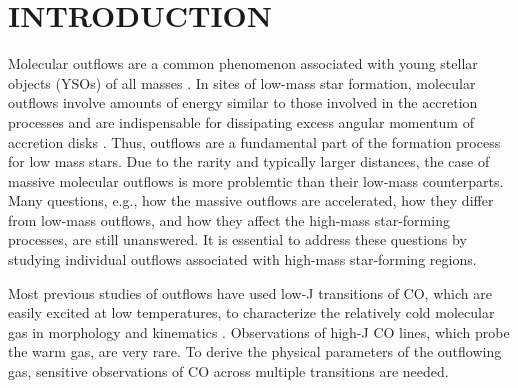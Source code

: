 \section{INTRODUCTION}
Molecular outflows are a common phenomenon associated with young stellar objects (YSOs) of all masses \citep{ 1985ARA&A..23..267L,1993prpl.conf..603F,2001ApJ...552L.167Z,2002A&A...383..892B,2015MNRAS.453..645M}. In sites of low-mass star formation, molecular outflows involve amounts of energy similar to those involved in the accretion processes and are indispensable for dissipating excess angular momentum of accretion disks \citep{1987ARA&A..25...23S, 1996ARA&A..34..111B}. Thus, outflows are a fundamental part of the formation process for low mass stars. Due to the rarity and typically larger distances, the case of massive molecular outflows is more problemtic than their low-mass counterparts. Many questions, e.g., how the massive outflows are accelerated, how they differ from low-mass outflows, and how they affect the high-mass star-forming processes, are still unanswered. It is essential to address these questions by studying individual outflows associated with high-mass star-forming regions. 

Most previous studies of outflows have used low-J transitions of CO, which are easily excited at low temperatures, to characterize the relatively cold molecular gas in morphology and kinematics \citep{2009ApJ...696...66Q,  2009ApJ...702L..66Q, 2011ApJ...728....6Q}. Observations of high-J CO lines, which probe the warm gas, are very rare. To derive the physical parameters of the outflowing gas, sensitive observations of CO across multiple transitions are needed. 

